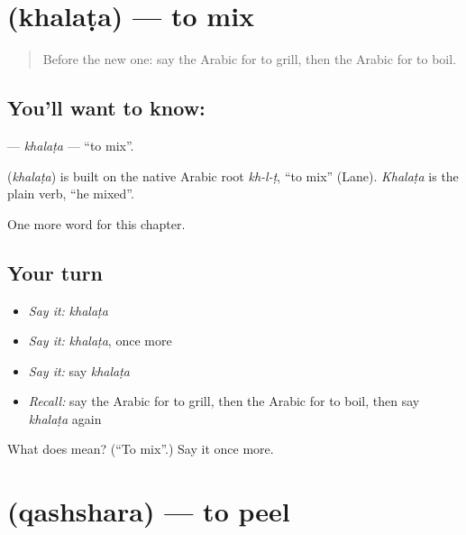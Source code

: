\section[\texorpdfstring{\ar{خلط} (khalaṭa)}{خلط (khalaṭa)}]{ (khalaṭa) — to mix}

\label{lesson:AR-C254-khalata}



\begin{quote}
Before the new one: say the Arabic for to grill, then the Arabic for to boil.
\end{quote}

\subsection*{You'll want to know: }
\textbf{} — \emph{khalaṭa} — \textquotedblleft{}to mix\textquotedblright{}.

\begin{cousinweb}
\textbf{} (\emph{khalaṭa}) is built on the native Arabic root \emph{kh-l-ṭ}, \textquotedblleft{}to mix\textquotedblright{} (Lane). \emph{Khalaṭa} is the plain verb, \textquotedblleft{}he mixed\textquotedblright{}.
\end{cousinweb}

\begin{grammarlens}[title={What you've built}]
One more word for this chapter.
\end{grammarlens}

\subsection*{Your turn}
\begin{itemize}
\raggedright
  \item \emph{Say it:} \emph{khalaṭa}
  \item \emph{Say it:} \emph{khalaṭa}, once more
  \item \emph{Say it:} say \emph{khalaṭa}
  \item \emph{Recall:} say the Arabic for to grill, then the Arabic for to boil, then say \emph{khalaṭa} again
\end{itemize}

\begin{tcolorbox}[breakable,colback=teal!4,colframe=teal!35!black,title={Before you move on}]
What does  mean? (\textquotedblleft{}To mix\textquotedblright{}.) Say it once more.
\end{tcolorbox}
\section[\texorpdfstring{\ar{قشر} (qashshara)}{قشر (qashshara)}]{ (qashshara) — to peel}

